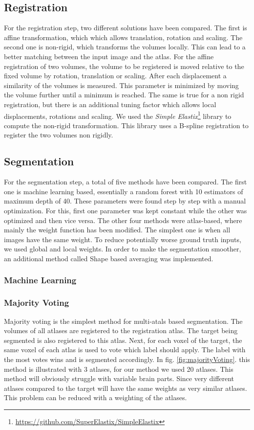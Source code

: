 \subsection*{Registration}
For the registration step, two different solutions have been compared. The first is affine transformation, which which allows translation, rotation and scaling. The second one is non-rigid, which transforms the volumes locally. This can lead to a better matching between the input image and the atlas. For the affine registration of two volumes, the volume to be registered is moved relative to the fixed volume by rotation, translation or scaling. After each displacement a similarity of the volumes is measured. This parameter is minimized by moving the volume further until a minimum is reached. The same is true for a non rigid registration, but there is an additional tuning factor which allows local displacements, rotations and scaling. We used the \textit{Simple Elastix}\footnote{\url{https://github.com/SuperElastix/SimpleElastix}} library to compute the non-rigid transformation. This library uses a B-spline registration to register the two volumes non rigidly.

\subsection*{Segmentation}
For the segmentation step, a total of five methods have been compared. The first one is machine learning based, essentially a random forest with 10 estimators of maximum depth of 40. These parameters were found step by step with a manual optimization. For this, first one parameter was kept constant while the other was optimized and then vice versa. The other four methods were atlas-based, where mainly the weight function has been modified. The simplest one is when all images have the same weight. To reduce potentially worse ground truth inputs, we used global and local weights. In order to make the segmentation smoother, an additional method called Shape based averaging was implemented.

\subsubsection*{Machine Learning}
\subsubsection*{Majority Voting}
Majority voting is the simplest method for multi-atals based segmentation. The volumes of all atlases are registered to the registration atlas. The target being segmented is also registered to this atlas. Next, for each voxel of the target, the same voxel of each atlas is used to vote which label should apply. The label with the most votes wins and is segmented accordingly. In fig. \ref{fig:majorityVoting}. this method is illustrated with 3 atlases, for our method we used 20 atlases. This method will obviously struggle with variable brain parts. Since very different atlases compared to the target will have the same weights as very similar atlases. This problem can be reduced with a weighting of the atlases.

